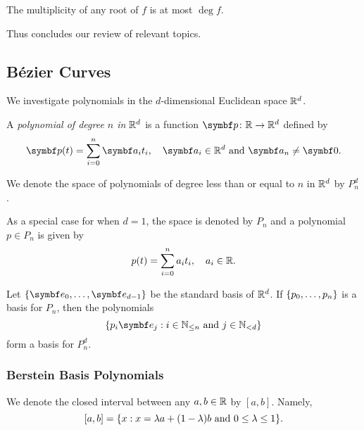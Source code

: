 The multiplicity of any root of \(f\) is at most \(\deg f\).

Thus concludes our review of relevant topics.

\subsection{Bézier Curves}

We investigate polynomials in the \(d\)-dimensional Euclidean space \(\mathbb{R}^d\).

\Bdf
  A \emph{polynomial of degree \(n\) in \(\mathbb{R}^d\)} is a function \(\map{\vct{p}}{\setreal}{\setreal^d}\) defined by
  \[
    \vct{p}(t) = \sum_{i = 0}^n \vct{a}_i t_i, \quad \vct{a}_i \in \setreal^d \text{ and } \vct{a}_n \neq \vct{0}.
  \]

  We denote the space of polynomials of degree less than or equal to \(n\) in \(\mathbb{R}^d\) by \(P_n^d\).

  As a special case for when \(d = 1\), the space is denoted by \(P_n\) and a polynomial \(p \in P_n\) is given by
  \[
    p(t) = \sum_{i = 0}^n a_i t_i, \quad a_i \in \mathbb{R}.
  \]
\Edf

Let \(\set{\vct{e}_0, \ldots, \vct{e}_{d - 1}}\) be the standard basis of \(\mathbb{R}^d\). If \(\{p_0, \ldots, p_n\}\)
is a basis for \(P_n\), then the polynomials
\[
  \set{p_i \vct{e}_j : i \in \setnat_{\leq n} \text{ and } j \in \setnat_{< d}}
\]
form a basis for \(P_n^d\).



\subsubsection{Berstein Basis Polynomials}

We denote the closed interval between any \(a, b \in \mathbb{R}\) by \([a, b]\). Namely,
\[
  [a, b] = \{x : x = \lambda a + (1 - \lambda) b \text{ and } 0 \leq \lambda \leq 1\}.
\]

